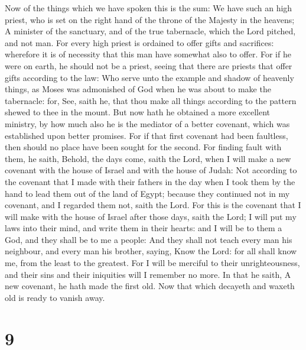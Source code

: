  Now of the things which we have spoken this is the sum:
We have such an high priest, who is set on the right hand of the throne
of the Majesty in the heavens;  A minister of the
sanctuary, and of the true tabernacle, which the Lord pitched, and not
man.  For every high priest is ordained to offer gifts and
sacrifices: wherefore it is of necessity that this man have somewhat
also to offer.  For if he were on earth, he should not be
a priest, seeing that there are priests that offer gifts according to
the law:  Who serve unto the example and shadow of
heavenly things, as Moses was admonished of God when he was about to
make the tabernacle: for, See, saith he, that thou make all things
according to the pattern shewed to thee in the mount.  But
now hath he obtained a more excellent ministry, by how much also he is
the mediator of a better covenant, which was established upon better
promises.  For if that first covenant had been faultless,
then should no place have been sought for the second.  For
finding fault with them, he saith, Behold, the days come, saith the
Lord, when I will make a new covenant with the house of Israel and with
the house of Judah:  Not according to the covenant that I
made with their fathers in the day when I took them by the hand to lead
them out of the land of Egypt; because they continued not in my
covenant, and I regarded them not, saith the Lord.  For
this is the covenant that I will make with the house of Israel after
those days, saith the Lord; I will put my laws into their mind, and
write them in their hearts: and I will be to them a God, and they shall
be to me a people:  And they shall not teach every man
his neighbour, and every man his brother, saying, Know the Lord: for all
shall know me, from the least to the greatest.  For I
will be merciful to their unrighteousness, and their sins and their
iniquities will I remember no more.  In that he saith, A
new covenant, he hath made the first old. Now that which decayeth and
waxeth old is ready to vanish away.

\hypertarget{section-8}{%
\section{9}\label{section-8}}

